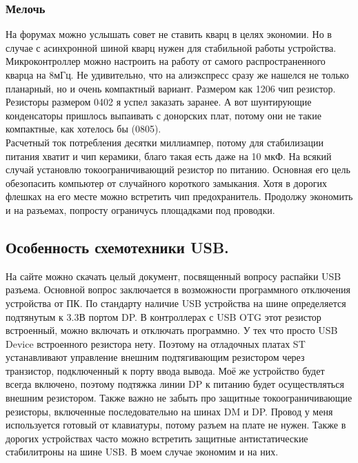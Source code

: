 \documentclass[12pt,a4paper]{article}
\begin{document}
\subsubsection{Мелочь}
    На форумах можно услышать совет не ставить кварц в целях экономии. Но
    в случае с асинхронной шиной кварц нужен для
    стабильной работы устройства. Микроконтроллер можно настроить на работу от
    самого распространенного кварца на 8мГц. Не удивительно, что на алиэкспресс
    сразу же нашелся не только планарный, но и очень компактный вариант.
    Размером как 1206 чип резистор. \\
    Резисторы размером 0402 я успел заказать заранее. А вот шунтирующие
    конденсаторы пришлось выпаивать с донорских плат, потому они не такие
    компактные, как хотелось бы (0805). \\
    Расчетный ток потребления десятки миллиампер, потому для стабилизации
    питания хватит и чип керамики, благо такая есть даже на 10 мкФ.
    На всякий случай установлю токоограничивающий резистор по питанию.
    Основная его цель обезопасить компьютер от случайного короткого замыкания.
    Хотя в дорогих флешках на его месте можно встретить чип предохранитель.
    Продолжу экономить и на разъемах, попросту ограничусь площадками под
    проводки.

\subsection{Особенность схемотехники USB.}
    На сайте можно скачать целый документ, посвященный вопросу распайки USB
    разъема. Основной вопрос заключается в возможности программного отключения
    устройства от ПК. По стандарту наличие USB устройства на шине определяется
    подтянутым к 3.3В портом DP. В контроллерах с USB OTG этот резистор
    встроенный, можно включать и отключать программно. У тех что просто USB
    Device встроенного резистора нету. Поэтому на отладочных платах ST
    устанавливают управление внешним подтягивающим резистором через транзистор,
    подключенный к порту ввода вывода. Моё же устройство будет всегда включено,
    поэтому подтяжка линии DP к питанию будет осуществляться внешним резистором.
    Также важно не забыть про защитные токоограничивающие резисторы, включенные
    последовательно на шинах DM и DP. Провод у меня используется
    готовый от клавиатуры, потому разъем на плате не нужен. Также в дорогих
    устройствах часто можно встретить защитные антистатические стабилитроны на
    шине USB. В моем случае экономим и на них.
\end{document}
